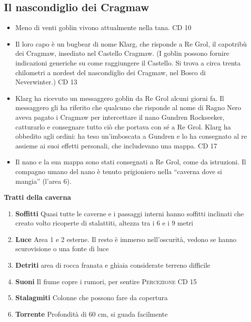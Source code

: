 \documentclass{article}
\begin{document}
    \hypertarget{cragmaw}{\subsection{Il nascondiglio dei Cragmaw}}
    \begin{itemize}
        \item Meno di venti goblin vivono attualmente nella tana. CD 10
        \item  Il loro capo è un bugbear di nome Klarg, che risponde a Re
Grol, il capotribù dei Cragmaw, insediato nel Castello Cragmaw.
(I goblin possono fornire indicazioni generiche su come
raggiungere il Castello. Si trova a circa trenta chilometri a nordest
del nascondiglio dei Cragmaw, nel Bosco di Neverwinter.) CD 13
        \item Klarg ha ricevuto un messaggero goblin da Re Grol alcuni giorni fa. Il messaggero gli ha riferito che qualcuno che risponde al
nome di Ragno Nero aveva pagato i Cragmaw per intercettare il
nano Gundren Rockseeker, catturarlo e consegnare tutto ciò che portava con sé a Re Grol. Klarg ha obbedito agli ordini: ha teso
un'imboscata a Gundren e lo ha consegnato al re assieme ai suoi effetti personali, che includevano una mappa. CD 17
    \item Il nano e la sua mappa sono stati consegnati a Re Grol, come
da istruzioni. Il compagno umano del nano è tenuto prigioniero
nella “caverna dove si mangia” (l'area 6). 
    
    \end{itemize}
    \textbf{Tratti della caverna}
        \begin{enumerate}
            \item \textbf{Soffitti} Quasi tutte le caverne e i passaggi interni hanno soffitti inclinati che creato volto ricoperte di stalattiti, altezza tra i 6 e i 9 metri
            \item \textbf{Luce} Area 1 e 2 esterne. Il resto è immerso nell'oscurità, vedono se hanno scurovisione o una fonte di luce
            \item \textbf{Detriti} area di rocca franata e  ghiaia considerate terreno difficile
            \item \textbf{Suoni} Il fiume copre i rumori, per sentire \textsc{Percezione} CD 15
            \item \textbf{Stalagmiti} Colonne che possono fare da copertura
            \item \textbf{Torrente} Profondità di 60 cm, si guada facilmente
        \end{enumerate}
\end{document}
